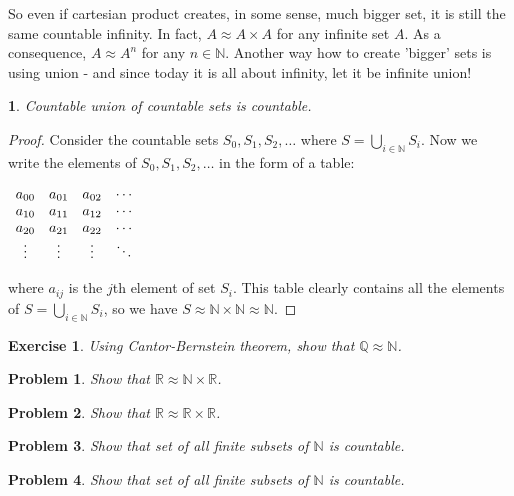 \documentclass[11pt,a5paper]{article}
\newtheorem{theorem}{}
\newtheorem{exercise}{Exercise}
\newtheorem{problem}{Problem}
\begin{document}
\noindent So even if cartesian product creates, in some sense, much bigger set, it is still the same countable infinity. In fact, $A\approx A\times A$ for any infinite set $A$. As a consequence, $A\approx A^n$ for any $n\in \mathbb{N}$. Another way how to create 'bigger' sets is using union - and since today it is all about infinity, let it be infinite union!
\begin{theorem}
Countable union of countable sets is countable.
\end{theorem}
\begin{proof} Consider the countable sets $S_0, S_1, S_2, \ldots$ where $\displaystyle S = \bigcup_{i \mathop \in \mathbb{N}} {S_i}$. Now we write the elements of $S_0, S_1, S_2, \ldots$ in the form of a table:

$\begin{array} {*{4}c} {a_{00}} & {a_{01}} & {a_{02}} & \cdots \\ {a_{10}} & {a_{11}} & {a_{12}} & \cdots \\ {a_{20}} & {a_{21}} & {a_{22}} & \cdots \\ \vdots & \vdots & \vdots & \ddots \\ \end{array}$

\noindent where $a_{ij}$ is the $j$th element of set $S_i$. This table clearly contains all the elements of $\displaystyle S = \bigcup_{i \mathop \in \mathbb{N}} {S_i}$, so we have $S \approx \mathbb{N}\times\mathbb{N} \approx \mathbb{N}$.
\end{proof}

\begin{exercise} Using Cantor-Bernstein theorem, show that $\mathbb{Q}\approx\mathbb{N}$. 
\end{exercise}
\begin{problem} Show that $\mathbb{R} \approx \mathbb{N} \times \mathbb{R}$.
\end{problem}
\begin{problem} Show that $\mathbb{R} \approx \mathbb{R} \times \mathbb{R}$.
\end{problem}
\begin{problem} Show that set of all finite subsets of $\mathbb{N}$ is countable.
\end{problem}
\begin{problem} Show that set of all finite subsets of $\mathbb{N}$ is countable.
\end{problem}
\end{document}
